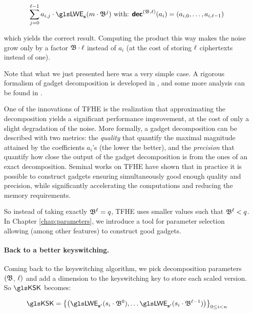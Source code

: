 \[
	\sum_{j=0}^{\levelDecomp - 1} a_{i,j} \cdot \LWE_{\lweSecretKey}(m \cdot \baseDecomp^j) \text{ with: } \decomp{\baseDecomp}{\levelDecomp}{a_i} = (a_{i, 0}, \dots, a_{i, \ell-1})
\]

\noindent which yields the correct result. Computing the product this way makes the noise grow only by a factor $\mathfrak{B} \cdot \ell$ instead of $a_i$ (at the cost of storing $\ell$ ciphertexts instead of one).



Note that what we just presented here was a very simple case. A rigorous formalism of gadget decomposition is developed in \cite{EC:GenMicPol19}, and some more analysis can be found in \cite{AC:Joye21}.


One of the innovations of \gls{TFHE} is the realization that approximating the decomposition yields a significant performance improvement, at the cost of only a slight degradation of the noise. More formally, a gadget decomposition can be described with two metrics: the \textit{quality} that quantify the maximal magnitude attained by the coefficients $a_i$'s (the lower the better), and the \textit{precision} that quantify how close the output of the gadget decomposition is from the ones of an exact decomposition. Seminal works on \gls{TFHE} have shown that in practice it is possible to construct gadgets ensuring simultaneously good enough quality and precision, while significantly accelerating the computations and reducing the memory requirements.

So instead of taking exactly $\mathfrak{B}^\ell = q$, \gls{TFHE} uses smaller values such that $\mathfrak{B}^\ell < q$. In Chapter \ref{chap:parameters}, we introduce a tool for parameter selection allowing (among other features) to construct good gadgets.


\paragraph{Back to a better keyswitching.}

Coming back to the keyswitching algorithm, we pick decomposition parameters $(\mathfrak{B}$, $\ell)$ and add a dimension to the keyswitching key to store each scaled version. So $\KSK$ becomes:

\[
	\KSK = \left \lbrace \left ( \LWE_{\lweSecretKey'} (s_i \cdot \baseDecomp^0), \dots  \LWE_{\lweSecretKey'} (s_i \cdot \baseDecomp^{\levelDecomp-1}) \right ) \right \rbrace_{0 \le i < n}
\]

